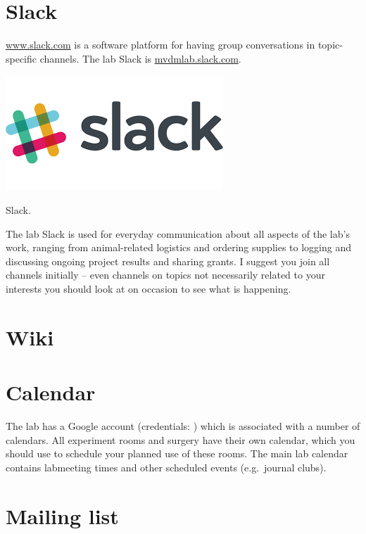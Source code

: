 \documentclass{tufte-book}
\begin{document}
\section{Slack}

\href{Slack}{www.slack.com} is a software platform for having group
conversations in topic-specific channels. The lab Slack is
\url{mvdmlab.slack.com}.

\begin{marginfigure}%
  \includegraphics[width=\linewidth]{images/slack.png}
  \caption{Slack.}
  \label{fig:slack}
\end{marginfigure}

The lab Slack is used for everyday communication about all aspects of
the lab's work, ranging from animal-related logistics and ordering
supplies to logging and discussing ongoing project results and sharing
grants. I suggest you join all channels initially -- even channels on
topics not necessarily related to your interests you should look at on
occasion to see what is happening.

\section{Wiki}

\section{Calendar}

The lab has a Google account (credentials: ) which is associated with
a number of calendars. All experiment rooms and surgery have their own
calendar, which you should use to schedule your planned use of these
rooms. The main lab calendar contains labmeeting times and other
scheduled events (e.g.\ journal clubs).

\section{Mailing list}
\end{document}
